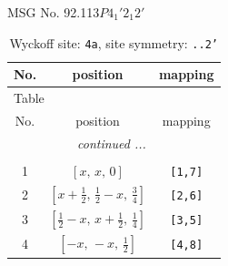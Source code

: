 \documentclass[fleqn,8pt]{jsarticle}
\begin{document}
\setcounter{MaxMatrixCols}{32}

\renewcommand{\tablename}{Table~}
\renewcommand{\figurename}{Figure~}
\begin{center}
\LARGE
MSG No. 92.113\quad$P4_{1}'2_{1}2'$
\end{center}
\renewcommand{\arraystretch}{1.2}
\begin{longtable}{ccc}
\caption{Wyckoff site: {\tt 4a}, site symmetry: {\tt ..2'}}
 \\
 \hline \hline
No. & position & mapping \\ \hline \endfirsthead

\multicolumn{2}{l}{\tablename\ \thetable{}} \\
 \hline \hline
No. & position & mapping \\ \hline \endhead

 \hline \hline
\multicolumn{2}{r}{\footnotesize\it continued ...} \\ \endfoot

 \hline \hline
\multicolumn{2}{r}{} \\ \endlastfoot

1 & $\left[ x,\, x,\, 0 \right]$ & {\tt [1,7]} \\ \hline
2 & $\left[ x + \frac{1}{2},\, \frac{1}{2} - x,\, \frac{3}{4} \right]$ & {\tt [2,6]} \\ \hline
3 & $\left[ \frac{1}{2} - x,\, x + \frac{1}{2},\, \frac{1}{4} \right]$ & {\tt [3,5]} \\ \hline
4 & $\left[ - x,\, - x,\, \frac{1}{2} \right]$ & {\tt [4,8]} \\
\end{longtable}
\renewcommand{\arraystretch}{1.2}
\end{document}

